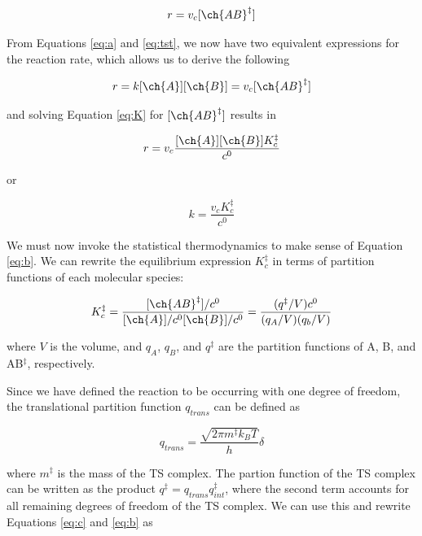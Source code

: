 \begin{equation}
  r = v_c [\ch{AB}^\ddagger]
\end{equation}

From Equations \ref{eq:a} and \ref{eq:tst}, we now have two equivalent expressions for the reaction rate, which allows us to derive the following

\begin{equation}
  r = k[\ch{A}][\ch{B}] = v_c [\ch{AB}^\ddagger]
\end{equation}

\noindent and solving Equation \ref{eq:K} for $[\ch{AB}^\ddagger]$ results in


\begin{equation}
  r = v_c\frac{[\ch{A}][\ch{B}]K_c^\ddagger}{c^0}
\end{equation}

\noindent or

\begin{equation}
  k = \frac{v_cK_c^\ddagger}{c^0}
\label{eq:b}
\end{equation}

We must now invoke the statistical thermodynamics to make sense of Equation \ref{eq:b}. We can rewrite the equilibrium expression $K_c^\ddagger$ in terms of partition functions of each molecular species:

\begin{equation}
    K_c^{\ddagger} = \frac{[\ch{AB}^\ddagger]/c^0}{[\ch{A}]/c^0[\ch{B}]/c^0}
    = \frac{(q^\ddagger/V)c^0}{(q_A/V)(q_b/V)}
\label{eq:c}
\end{equation}

\noindent where $V$ is the volume, and $q_A$, $q_B$, and $q^\ddagger$ are the partition functions of A, B, and AB$^\ddagger$, respectively.

Since we have defined the reaction to be occurring with one degree of freedom, the translational partition function $q_{trans}$ can be defined as

\begin{equation}
  q_{trans} = \frac{\sqrt{2\pi m^\ddagger k_BT}}{h}\delta
\end{equation}

\noindent where $m^\ddagger$ is the mass of the TS complex. The partion function of the TS complex can be written as the product $q^\ddagger = q_{trans}q_{int}^\ddagger$, where the second term accounts for all remaining degrees of freedom of the TS complex. We can use this and rewrite Equations \ref{eq:c} and \ref{eq:b} as

